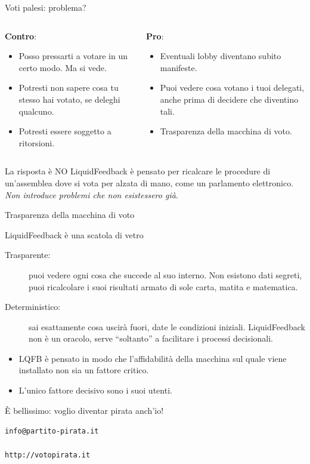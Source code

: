 \begin{frame}{Voti palesi: problema?}
\begin{columns}
\begin{column}[t]{.5\textwidth}
\textbf{Contro}:\begin{itemize}
\item Posso pressarti a votare in un certo modo. Ma si vede.
\item Potresti non sapere cosa tu stesso hai votato, se deleghi qualcuno.
\item Potresti essere soggetto a ritorsioni.
\end{itemize}
\end{column}
\begin{column}[t]{.5\textwidth}
\textbf{Pro}:\begin{itemize}
\item Eventuali lobby diventano subito manifeste.
\item Puoi vedere cosa votano i tuoi delegati, anche prima di decidere che diventino tali.
\item \alert{Trasparenza della macchina di voto}.
\end{itemize}
\end{column}
\end{columns}\pause
\begin{block}{La risposta è NO}
LiquidFeedback è pensato per ricalcare le procedure di un'assemblea dove si vota per alzata di mano, come un parlamento elettronico. \emph{Non introduce problemi che non esistessero già}.
\end{block}
\end{frame}

\begin{frame}{Trasparenza della macchina di voto}
\begin{block}{LiquidFeedback è una scatola di vetro}
\begin{description}
\item[Trasparente:] puoi vedere ogni cosa che succede al suo interno. Non esistono dati segreti, puoi ricalcolare i suoi risultati armato di sole carta, matita e matematica.
\item[Deterministico:] sai esattamente cosa uscirà fuori, date le condizioni iniziali. LiquidFeedback non è un oracolo, serve ``soltanto'' a facilitare i processi decisionali.
\end{description}
\end{block}
\begin{itemize}
\item LQFB è pensato in modo che l'affidabilità della macchina sul quale viene installato non sia un fattore critico.
\item \alert{L'unico fattore decisivo sono i suoi utenti}.
\end{itemize}
\end{frame}

\begin{frame}{È bellissimo: voglio diventar pirata anch'io!}

\begin{center}
{\huge \texttt{info@partito-pirata.it \\~\\ http://votopirata.it}}
\end{center}

\end{frame}

